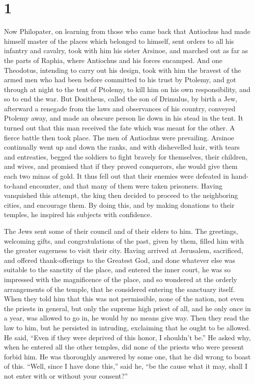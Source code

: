 \hypertarget{section}{%
\section{1}\label{section}}

 Now Philopater, on learning from those who came back that
Antiochus had made himself master of the places which belonged to
himself, sent orders to all his infantry and cavalry, took with him his
sister Arsinoe, and marched out as far as the parts of Raphia, where
Antiochus and his forces encamped.  And one Theodotus,
intending to carry out his design, took with him the bravest of the
armed men who had been before committed to his trust by Ptolemy, and got
through at night to the tent of Ptolemy, to kill him on his own
responsibility, and so to end the war.  But Dositheus,
called the son of Drimulus, by birth a Jew, afterward a renegade from
the laws and observances of his country, conveyed Ptolemy away, and made
an obscure person lie down in his stead in the tent. It turned out that
this man received the fate which was meant for the other.  A
fierce battle then took place. The men of Antiochus were prevailing.
Arsinoe continually went up and down the ranks, and with dishevelled
hair, with tears and entreaties, begged the soldiers to fight bravely
for themselves, their children, and wives, and promised that if they
proved conquerors, she would give them each two minas of gold.
 It thus fell out that their enemies were defeated in
hand-to-hand encounter, and that many of them were taken prisoners.
 Having vanquished this attempt, the king then decided to
proceed to the neighboring cities, and encourage them.  By
doing this, and by making donations to their temples, he inspired his
subjects with confidence.

 The Jews sent some of their council and of their elders to
him. The greetings, welcoming gifts, and congratulations of the past,
given by them, filled him with the greater eagerness to visit their
city.  Having arrived at Jerusalem, sacrificed, and offered
thank-offerings to the Greatest God, and done whatever else was suitable
to the sanctity of the place, and entered the inner court, 
he was so impressed with the magnificence of the place, and so wondered
at the orderly arrangements of the temple, that he considered entering
the sanctuary itself.  When they told him that this was not
permissible, none of the nation, not even the priests in general, but
only the supreme high priest of all, and he only once in a year, was
allowed to go in, he would by no means give way.  Then they
read the law to him, but he persisted in intruding, exclaiming that he
ought to be allowed. He said, ``Even if they were deprived of this
honor, I shouldn't be.''  He asked why, when he entered all
the other temples, did none of the priests who were present forbid him.
 He was thoroughly answered by some one, that he did wrong
to boast of this.  ``Well, since I have done this,'' said
he, ``be the cause what it may, shall I not enter with or without your
consent?''

